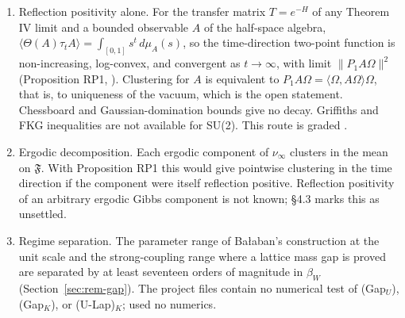 \begin{enumerate}
\item Reflection positivity alone. For the transfer matrix $T=e^{-H}$ of any Theorem IV limit and a bounded observable $A$ of the half-space algebra, $\langle\Theta(A)\tau_tA\rangle=\int_{[0,1]}s^t\,d\mu_A(s)$, so the time-direction two-point function is non-increasing, log-convex, and convergent as $t\to\infty$, with limit $\|P_1A\Omega\|^2$ (Proposition RP1, ). Clustering for $A$ is equivalent to $P_1A\Omega=\langle\Omega,A\Omega\rangle\Omega$, that is, to uniqueness of the vacuum, which is the open statement. Chessboard and Gaussian-domination bounds give no decay. Griffiths and FKG inequalities are not available for SU(2). This route is graded .
\item Ergodic decomposition. Each ergodic component of $\nu_\infty$ clusters in the mean on $\mathfrak F$. With Proposition RP1 this would give pointwise clustering in the time direction if the component were itself reflection positive. Reflection positivity of an arbitrary ergodic Gibbs component is not known;  \S4.3 marks this as unsettled.
\item Regime separation. The parameter range of Ba{\l}aban's construction at the unit scale and the strong-coupling range where a lattice mass gap is proved are separated by at least seventeen orders of magnitude in $\beta_W$ (Section~\ref{sec:rem-gap}). The project files contain no numerical test of (Gap$_U$), (Gap$_K$), or (U-Lap)$_K$;  used no numerics.
\end{enumerate}

